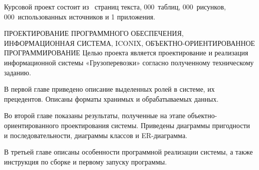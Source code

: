 \label{chap:abstract}

Курсовой проект состоит из \pageref*{LastPage}~страниц текста, 
000~таблиц, 000~рисунков, 000~использованных источников и 1 приложения.

\MakeUppercase{
Проектирование программного обеспечения, информационная система, 
ICONIX, объектно-ориентированное программирование
}
Целью проекта является проектирование и реализация информационной 
системы «Грузоперевозки» согласно полученному техническому заданию. 

В первой главе приведено описание выделенных ролей в системе, их 
прецедентов. Описаны форматы хранимых и обрабатываемых данных. 
 
Во второй главе показаны результаты, полученные на этапе объектно-
ориентированного проектирования системы. Приведены диаграммы пригодности 
и последовательности, диаграммы классов и ER-диаграмма. 
 
В третьей главе описаны особенности программной реализации системы, 
а также инструкция по сборке и первому запуску программы.
